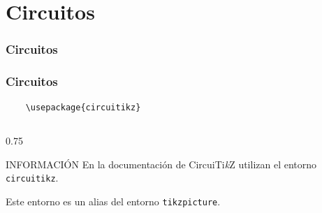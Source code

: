 \documentclass[12pt,aspectratio=169,ignorenonframetext]{ltxbeamer}
\newcommand{\TikZ}{Ti\textit{k}Z}
\begin{document}
\section{Circuitos}

\begin{frame}
\frametitle{Circuitos}

\begin{center}
    \lmr
\end{center}
\end{frame}





\begin{frame}[fragile]
\frametitle{Circuitos}

\begin{verbatim}
    \usepackage{circuitikz}
\end{verbatim}

\pause

\begin{columns}
    \begin{column}{0.75\textwidth}
        \begin{block}{INFORMACIÓN}
            En la documentación de {\lmr Circui\TikZ} utilizan el entorno \texttt{circuitikz}.

            Este entorno es un alias del entorno \texttt{tikzpicture}.
        \end{block}
    \end{column}
\end{columns}
\end{frame}
\end{document}
